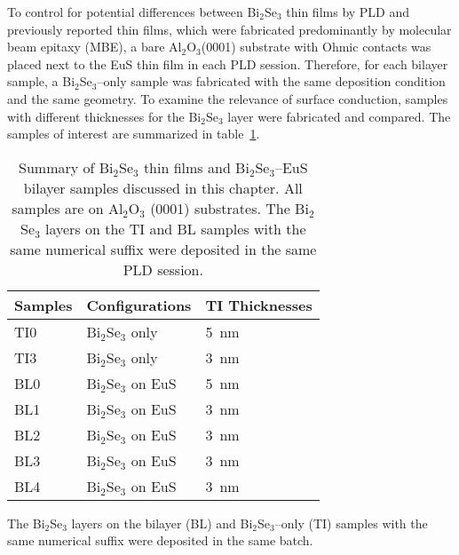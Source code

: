 To control for potential differences between Bi$_2$Se$_3$ thin films by PLD and previously reported thin films, which were fabricated predominantly by molecular beam epitaxy (MBE), a bare Al$_2$O$_3$(0001) substrate with Ohmic contacts was placed next to the EuS thin film in each PLD session. Therefore, for each bilayer sample, a Bi$_2$Se$_3$--only sample was fabricated with the same deposition condition and the same geometry. To examine the relevance of surface conduction, samples with different thicknesses for the Bi$_2$Se$_3$ layer were fabricated and compared. The samples of interest are summarized in table~\ref{tab:bl2014_samples}.%
\begin{table}[ht]
    \centering
    \begin{tabularx}{0.6\columnwidth}[t]{l|l|X}
    \caption[Summary of Bi$_2$Se$_3$ thin films and Bi$_2$Se$_3$--EuS bilayer samples]{\label{tab:bl2014_samples}Summary of Bi$_2$Se$_3$ thin films and Bi$_2$Se$_3$--EuS bilayer samples discussed in this chapter. All samples are on Al$_2$O$_3$ (0001) substrates. The Bi$_2$Se$_3$ layers on the TI and BL samples with the same numerical suffix were deposited in the same PLD session.}\\
		\hline\hline
        Samples & Configurations & TI Thicknesses\\
        \hline
        TI0 & Bi$_2$Se$_3$ only & 5~nm\\
        TI3 & Bi$_2$Se$_3$ only & 3~nm\\
        BL0 & Bi$_2$Se$_3$ on EuS & 5~nm\\
        BL1 & Bi$_2$Se$_3$ on EuS & 3~nm\\
        BL2 & Bi$_2$Se$_3$ on EuS & 3~nm\\
        BL3 & Bi$_2$Se$_3$ on EuS & 3~nm\\
        BL4 & Bi$_2$Se$_3$ on EuS & 3~nm\\
		\hline\hline
    \end{tabularx}
\end{table} %
The Bi$_2$Se$_3$ layers on the bilayer (BL) and Bi$_2$Se$_3$--only (TI) samples with the same numerical suffix were deposited in the same batch.


\FloatBarrier%
